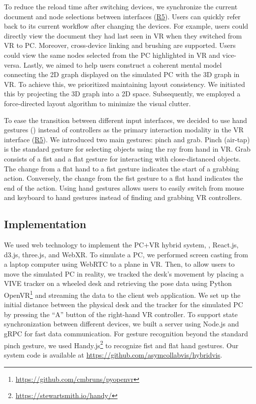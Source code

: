 To reduce the reload time after switching devices, we synchronize the current document and node selections between interfaces (\hyperref[req:r5]{R5}).
Users can quickly refer back to its current workflow after changing the devices.
For example, users could directly view the document they had last seen in VR when they switched from VR to PC.
Moreover, cross-device linking and brushing are supported. Users could view the same nodes selected from the PC highlighted in VR and vice-versa.
Lastly, we aimed to help users construct a coherent mental model connecting the 2D graph displayed on the simulated PC with the 3D graph in VR.
To achieve this, we prioritized maintaining layout consistency. We initiated this by projecting the 3D graph into a 2D space. Subsequently, we employed a force-directed layout algorithm to minimize the visual clutter.


 To ease the transition between different input interfaces, we decided to use hand gestures () instead of controllers as the primary interaction modality in the VR interface (\hyperref[req:r5]{R5}). We introduced two main gestures: pinch and grab.
Pinch (air-tap) is the standard gesture for selecting objects using the ray from hand in VR. Grab consists of a fist and a flat gesture for interacting with close-distanced objects. The change from a flat hand to a fist gesture indicates the start of a grabbing action. Conversely, the change from the fist gesture to a flat hand indicates the end of the action. Using hand gestures allows users to easily switch from mouse and keyboard to hand gestures instead of finding and grabbing VR controllers.

\subsection{Implementation}
We used web technology to implement the PC+VR hybrid system,
\ie{}, React.js, d3.js, three.js, and WebXR. To simulate a PC, we performed screen casting from a laptop computer using WebRTC to a plane in VR. Then, to allow users to move the simulated PC in reality, we tracked the desk's movement by placing a VIVE tracker on a wheeled desk and retrieving the pose data using Python OpenVR\footnote{\url{https://github.com/cmbruns/pyopenvr}} and streaming the data to the client web application. 
We set up the initial distance between the physical desk and the tracker for the simulated PC by pressing the ``A'' button of the right-hand VR controller.
To support state synchronization between different devices, we built a server using Node.js and gRPC for fast data communication. 
For gesture recognition beyond the standard pinch gesture, we used Handy.js\footnote{\url{https://stewartsmith.io/handy/}} to recognize fist and flat hand gestures.
Our system code is available at \url{https://github.com/asymcollabvis/hybridvis}.
